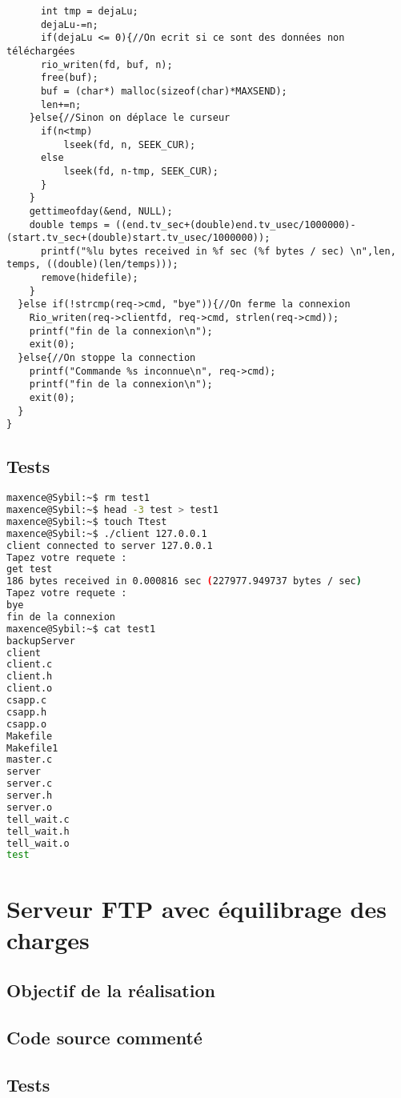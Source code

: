 \documentclass{report}
\begin{document}
\begin{lstlisting}
      int tmp = dejaLu;
      dejaLu-=n;
      if(dejaLu <= 0){//On ecrit si ce sont des données non téléchargées
      rio_writen(fd, buf, n);
      free(buf);
      buf = (char*) malloc(sizeof(char)*MAXSEND);
      len+=n;
    }else{//Sinon on déplace le curseur
      if(n<tmp)
          lseek(fd, n, SEEK_CUR);
      else
          lseek(fd, n-tmp, SEEK_CUR);
      }
    }
    gettimeofday(&end, NULL);
    double temps = ((end.tv_sec+(double)end.tv_usec/1000000)-(start.tv_sec+(double)start.tv_usec/1000000));
      printf("%lu bytes received in %f sec (%f bytes / sec) \n",len, temps, ((double)(len/temps)));
      remove(hidefile);
    }
  }else if(!strcmp(req->cmd, "bye")){//On ferme la connexion
    Rio_writen(req->clientfd, req->cmd, strlen(req->cmd));
    printf("fin de la connexion\n");
    exit(0);
  }else{//On stoppe la connection
    printf("Commande %s inconnue\n", req->cmd);
    printf("fin de la connexion\n");
    exit(0);
  }
}
            \end{lstlisting}

      \section{Tests}
      \begin{lstlisting}[frame=single,basicstyle=\footnotesize,language=bash]
maxence@Sybil:~$ rm test1
maxence@Sybil:~$ head -3 test > test1
maxence@Sybil:~$ touch Ttest
maxence@Sybil:~$ ./client 127.0.0.1
client connected to server 127.0.0.1
Tapez votre requete :
get test
186 bytes received in 0.000816 sec (227977.949737 bytes / sec)
Tapez votre requete :
bye
fin de la connexion
maxence@Sybil:~$ cat test1
backupServer
client
client.c
client.h
client.o
csapp.c
csapp.h
csapp.o
Makefile
Makefile1
master.c
server
server.c
server.h
server.o
tell_wait.c
tell_wait.h
tell_wait.o
test
\end{lstlisting}

    \chapter{Serveur FTP avec \'equilibrage des charges}
      \section{Objectif de la r\'ealisation}
      \section{Code source comment\'e}
      \section{Tests}
\end{document}
